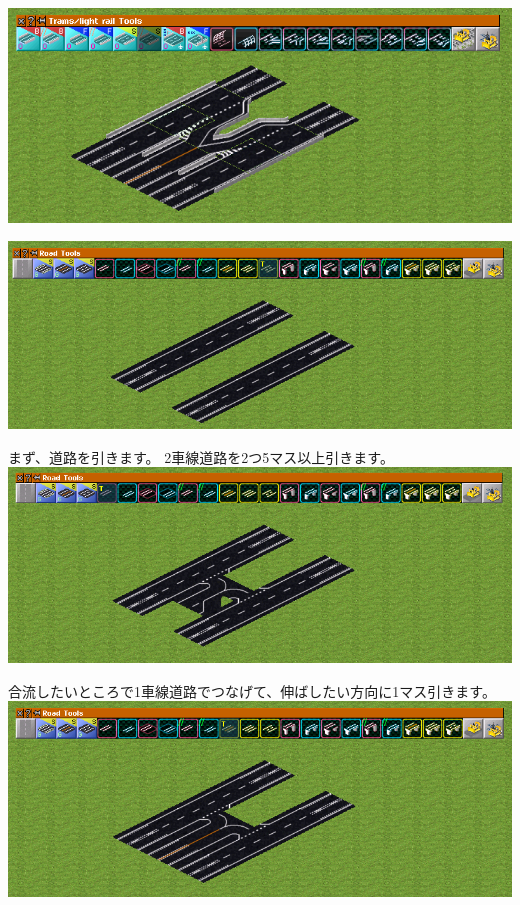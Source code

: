 \documentclass{jbook}
\begin{document}
  \includegraphics[width = 135mm]{picture/20210214-road-1-9.png}

  \vspace{10pt}
  \includegraphics[width = 135mm]{picture/20210214-road-1-1.png}


  まず、道路を引きます。
  2車線道路を2つ5マス以上引きます。
  \\


  \includegraphics[width = 135mm]{picture/20210214-road-1-2.png}


  合流したいところで1車線道路でつなげて、伸ばしたい方向に1マス引きます。
  \\


  \includegraphics[width = 135mm]{picture/20210214-road-1-3.png}
\end{document}
